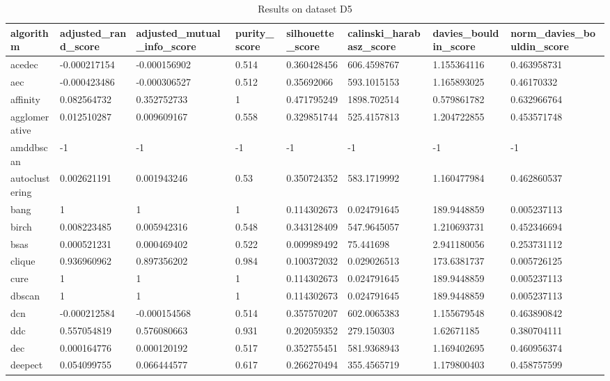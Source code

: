 \begin{table}[H]
\centering
\caption{Results on dataset D5}
\label{tab:params:D5}
\begin{tabular}{|l|l|l|l|l|l|l|l|}
\hline
algorithm & adjusted\_rand\_score & adjusted\_mutual\_info\_score & purity\_score & silhouette\_score & calinski\_harabasz\_score & davies\_bouldin\_score & norm\_davies\_bouldin\_score \\
\hline
acedec & -0.000217154 & -0.000156902 & 0.514 & 0.360428456 & 606.4598767 & 1.155364116 & 0.463958731 \\
\hline
aec & -0.000423486 & -0.000306527 & 0.512 & 0.35692066 & 593.1015153 & 1.165893025 & 0.46170332 \\
\hline
affinity & 0.082564732 & 0.352752733 & 1 & 0.471795249 & 1898.702514 & 0.579861782 & 0.632966764 \\
\hline
agglomerative & 0.012510287 & 0.009609167 & 0.558 & 0.329851744 & 525.4157813 & 1.204722855 & 0.453571748 \\
\hline
amddbscan & -1 & -1 & -1 & -1 & -1 & -1 & -1 \\
\hline
autoclustering & 0.002621191 & 0.001943246 & 0.53 & 0.350724352 & 583.1719992 & 1.160477984 & 0.462860537 \\
\hline
bang & 1 & 1 & 1 & 0.114302673 & 0.024791645 & 189.9448859 & 0.005237113 \\
\hline
birch & 0.008223485 & 0.005942316 & 0.548 & 0.343128409 & 547.9645057 & 1.210693731 & 0.452346694 \\
\hline
bsas & 0.000521231 & 0.000469402 & 0.522 & 0.009989492 & 75.441698 & 2.941180056 & 0.253731112 \\
\hline
clique & 0.936960962 & 0.897356202 & 0.984 & 0.100372032 & 0.029026513 & 173.6381737 & 0.005726125 \\
\hline
cure & 1 & 1 & 1 & 0.114302673 & 0.024791645 & 189.9448859 & 0.005237113 \\
\hline
dbscan & 1 & 1 & 1 & 0.114302673 & 0.024791645 & 189.9448859 & 0.005237113 \\
\hline
dcn & -0.000212584 & -0.000154568 & 0.514 & 0.357570207 & 602.0065383 & 1.155679548 & 0.463890842 \\
\hline
ddc & 0.557054819 & 0.576080663 & 0.931 & 0.202059352 & 279.150303 & 1.62671185 & 0.380704111 \\
\hline
dec & 0.000164776 & 0.000120192 & 0.517 & 0.352755451 & 581.9368943 & 1.169402695 & 0.460956374 \\
\hline
deepect & 0.054099755 & 0.066444577 & 0.617 & 0.266270494 & 355.4565719 & 1.179800403 & 0.458757599 \\

\end{tabular}
\end{table}
